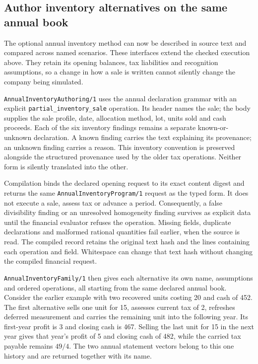

\subsection*{Author inventory alternatives on the same annual book}

The optional annual inventory method can now be described in source text and
compared across named scenarios.  These interfaces extend the checked execution
above.  They retain its opening balances, tax liabilities and recognition
assumptions, so a change in how a sale is written cannot silently change the
company being simulated.

\texttt{Annual\allowbreak{}Inventory\allowbreak{}Authoring/1} uses the annual declaration grammar with an
explicit \texttt{partial\_\allowbreak{}inventory\_\allowbreak{}sale} operation.  Its header names the sale;
the body supplies the sale profile, date, allocation method, lot, units sold and
cash proceeds.  Each of the six inventory findings remains a separate
known-or-unknown declaration.  A known finding carries the text explaining its
provenance; an unknown finding carries a reason.  This inventory convention is
preserved alongside the structured provenance used by the older tax
operations.  Neither form is silently translated into the other.

Compilation binds the declared opening request to its exact content digest and
returns the same \texttt{Annual\allowbreak{}Inventory\allowbreak{}Program/1} request as the typed form.
It does not execute a sale, assess tax or advance a period.  Consequently, a
false divisibility finding or an unresolved homogeneity finding survives as
explicit data until the financial evaluator refuses the operation.  Missing
fields, duplicate declarations and malformed rational quantities fail earlier,
when the source is read.  The compiled record retains the original text hash
and the lines containing each operation and field.  Whitespace can change
that text hash without changing the compiled financial request.

\texttt{Annual\allowbreak{}Inventory\allowbreak{}Family/1} then gives each alternative its own name,
assumptions and ordered operations, all starting from the same declared annual
book.  Consider the earlier example with two recovered units costing 20 and
cash of 452.  The first alternative sells one unit for 15, assesses current tax
of 2, refreshes deferred measurement and carries the remaining unit into the
following year.  Its first-year profit is 3 and closing cash is 467.  Selling the
last unit for 15 in the next year gives that year's profit of 5 and closing cash
of 482, while the carried tax payable remains \(49/4\).  The two annual statement
vectors belong to this one history and are returned together with its name.

